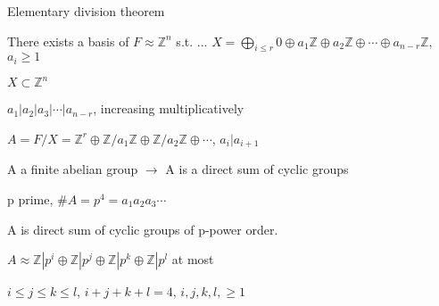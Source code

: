 \documentclass[12pt]{article}
\begin{document}
\noindent
Elementary division theorem

There exists a basis of $F \approx \mathds{Z}^n$ s.t. ... $X = \bigoplus_{i \leq r}0 \oplus a_1\mathds{Z} \oplus a_2\mathds{Z} \oplus \cdots \oplus a_{n - r}\mathds{Z}$, $a_i \geq 1$

$X \subset \mathds{Z}^n$

$a_1 | a_2 | a_3 | \cdots | a_{n - r}$, increasing multiplicatively

$A = F/X = \mathds{Z}^r \oplus \mathds{Z}/a_1\mathds{Z} \oplus \mathds{Z}/a_2\mathds{Z} \oplus \cdots$, $a_i | a_{i + 1}$

A a finite abelian group $\to$ A is a direct sum of cyclic groups

\noindent
p prime, $\#A = p^4 = a_1a_2a_3\cdots$

A is direct sum of cyclic groups of p-power order.

$A \approx \mathds{Z}|p^i \oplus \mathds{Z}|p^j \oplus \mathds{Z}|p^k \oplus \mathds{Z}|p^l$ at most

$i \leq j \leq k \leq l$, $i + j + k + l = 4$, $i, j, k, l, \geq 1$
\end{document}
